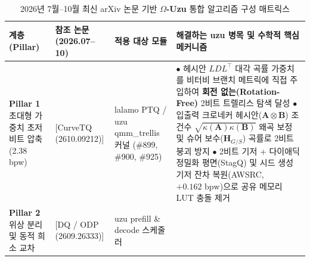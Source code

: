 \documentclass[10pt,a4paper]{article}
\begin{document}
\begin{table}[ht!]
\centering
\small
\caption{2026년 7월--10월 최신 arXiv 논문 기반 \textbf{$\Omega$-Uzu} 통합 알고리즘 구성 매트릭스}
\vspace{2mm}
\begin{tabularx}{\textwidth}{p{2.2cm} p{3.5cm} p{2.6cm} X}
\toprule
\textbf{계층 (Pillar)} & \textbf{참조 논문 (2026.07--10)} & \textbf{적용 대상 모듈} & \textbf{해결하는 \textsf{uzu} 병목 및 수학적 핵심 메커니즘} \\
\midrule
\textbf{Pillar 1} \newline 초대형 가중치 \newline 초저비트 압축 \newline (2.38 bpw) &
[CurveTQ (2610.09212)] \cite{ding2026curvetq} \newline
[KronQ (2607.07964)] \cite{lee2026kronq} \newline
[CASA (2609.25916)] \cite{yoshida2026casa} \newline
[SchurQuant (2608.15567)] \cite{lee2026schurquant}  \cite{liu2026g2ptq} \newline
[StagQ (2610.05977)] \cite{wei2026stagq} \newline
[AWSRC (2608.23144)] \cite{liu2026awsrc} &
\textsf{lalamo} PTQ / \newline \textsf{uzu} \textsf{qmm\_trellis} \newline 커널 (\#899, \#900, \#925) &
$\bullet$ 헤시안 $LDL^\top$ 대각 곡률 가중치를 비터비 브랜치 메트릭에 직접 주입하여 \textbf{회전 없는(Rotation-Free)} 2비트 트렐리스 탐색 달성 \newline
$\bullet$ 입출력 크로네커 헤시안($\mathbf{A} \otimes \mathbf{B}$) 조건수 $\sqrt{\kappa(\mathbf{A})\kappa(\mathbf{B})}$ 왜곡 보정 및 슈어 보수($\mathbf{H}_{G/S}$) 곡률로 2비트 붕괴 방지 \newline
$\bullet$ 2비트 기저 + 다이애딕 정밀화 평면(\textsf{StagQ}) 및 시드 생성 기저 잔차 복원(\textsf{AWSRC}, $+0.162\text{ bpw}$)으로 공유 메모리 LUT 충돌 제거 \\
\midrule
\textbf{Pillar 2} \newline 위상 분리 및 \newline 동적 희소 교차 &
[DQ / ODP (2609.26333)] \cite{panferov2026dq} \newline
[ByteCross (2609.33889)] \cite{lee2026bytecross} \newline
[KV-Wall (2609.30854)] \cite{singh2026kvwall} &
\textsf{uzu} \textsf{prefill} \& \newline \textsf{decode} 스케줄러 &

\end{tabularx}
\end{table}
\end{document}
